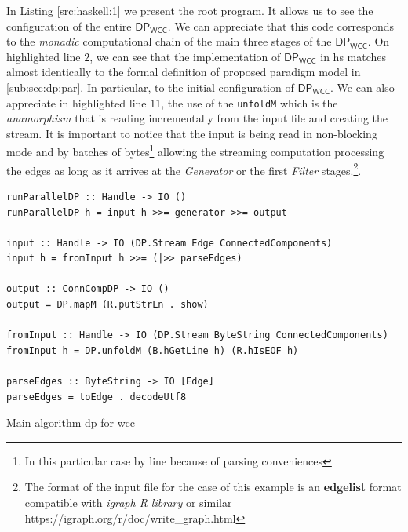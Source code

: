 \documentclass[preprint]{elsarticle}
\newcommand{\dpwcc}{\mathsf{DP_{WCC}}}
\begin{document}
%
In Listing \ref{src:haskell:1} we present the root program. It allows us to see the configuration of the entire $\dpwcc$. We can appreciate that this code corresponds to the \textit{monadic} computational chain of the main three stages of the $\dpwcc$.  On highlighted line $2$, we can see that the implementation of $\dpwcc$ in \acrshort{hs} matches almost identically to the formal definition of proposed paradigm model in \autoref{sub:sec:dp:par}. In particular, to the initial configuration of $\dpwcc$. We can also appreciate in highlighted line $11$, the use of the \texttt{unfoldM} which is the \emph{anamorphism} that is reading incrementally from the input file and creating the stream. It is important to notice that the input is being read in non-blocking mode and by batches of bytes\footnote{In this particular case by line because of parsing conveniences} allowing the streaming computation processing the edges as long as it arrives at the \textit{Generator} or the first \textit{Filter} stages.\footnote{The format of the input file for the case of this example is an \textbf{edgelist} format compatible with \emph{igraph R library} or similar https://igraph.org/r/doc/write\_graph.html}.


\begin{listing}[H]
\begin{verbatim}
runParallelDP :: Handle -> IO ()
runParallelDP h = input h >>= generator >>= output

input :: Handle -> IO (DP.Stream Edge ConnectedComponents)
input h = fromInput h >>= (|>> parseEdges)

output :: ConnCompDP -> IO ()
output = DP.mapM (R.putStrLn . show)

fromInput :: Handle -> IO (DP.Stream ByteString ConnectedComponents)
fromInput h = DP.unfoldM (B.hGetLine h) (R.hIsEOF h)

parseEdges :: ByteString -> IO [Edge]
parseEdges = toEdge . decodeUtf8
\end{verbatim}
\caption{Main algorithm \acrshort{dp} for \acrshort{wcc}}
\label{src:haskell:1}
\end{listing}
\end{document}
